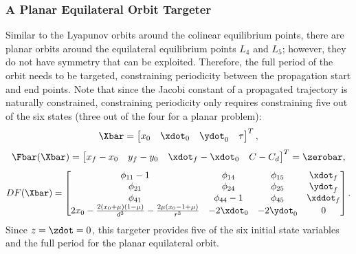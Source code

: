 \subsubsection{A Planar Equilateral Orbit Targeter}
Similar to the Lyapunov orbits around the colinear equilibrium points, there are planar orbits
around the equilateral equilibrium points $L_{4}$ and $L_{5}$; however, they do not have symmetry
that can be exploited. Therefore, the full period of the orbit needs to be targeted, constraining
periodicity between the propagation start and end points. Note that since the Jacobi constant of a
propagated trajectory is naturally constrained, constraining periodicity only requires constraining
five out of the six states (three out of the four for a planar problem):
\begin{equation}
    \Xbar=\begin{bmatrix}   x_{0}   &   \xdot_{0}   &   \ydot_{0}   &   \tau    \end{bmatrix}^{T},
    \label{eq:longfreevar}
\end{equation}
\begin{equation}
    \Fbar(\Xbar)=\begin{bmatrix}    x_{f}-x_{0} &   y_{f}-y_{0} &   \xdot_{f}-\xdot_{0} &   C-C_{d} \end{bmatrix}^{T}=\zerobar,
    \label{eq:longconst}
\end{equation}
\begin{equation}
    DF(\Xbar)=\begin{bmatrix}   \phi_{11}-1                                                                 &   \phi_{14}   &   \phi_{15}   &   \xdot_{f}   \\
                                \phi_{21}                                                                   &   \phi_{24}   &   \phi_{25}   &   \ydot_{f}   \\
                                \phi_{41}                                                                   &   \phi_{44}-1 &   \phi_{45}   &   \xddot_{f}  \\
                                2x_{0}-\frac{2(x_{0}+\mu)(1-\mu)}{d^{3}}-\frac{2\mu(x_{0}-1+\mu)}{r^{3}}    &   -2\xdot_{0} &   -2\ydot_{0} &   0           \end{bmatrix}.
    \label{eq:longjacobian}
\end{equation}
Since $z=\zdot=0$, this targeter provides five of the six initial state variables and the full
period for the planar equilateral orbit.

